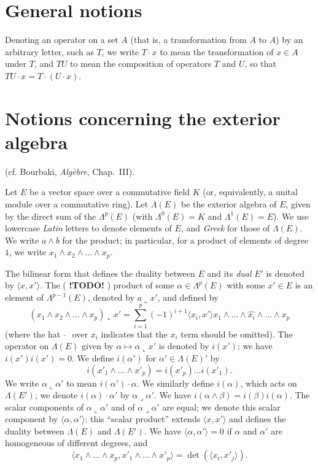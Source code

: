 \documentclass{article}
\newcommand{\llp}{\mathbin{\llcorner}}
\newcommand{\lrp}{\mathbin{\lrcorner}}
\newcommand{\todo}{\textbf{ !TODO! }}
\newcommand{\oldpage}[1]{\marginpar{\footnotesize$\Big\vert$ \textit{p.~#1}}}
\begin{document}
\section{General notions}
\label{I.1}

Denoting an operator on a set $A$ (that is, a transformation from $A$ to $A$) by an arbitrary letter, such as $T$, we write $T\cdot x$ to mean the transformation of $x\in A$ under $T$, and $TU$ to mean the composition of operators $T$ and $U$, so that $TU\cdot x = T\cdot (U\cdot x)$.


\section{Notions concerning the exterior algebra}
\label{I.2}

{(cf. {\sc Bourbaki}, \emph{Alg\`{e}bre}, Chap.~III).}

Let $E$ be a vector space over a commutative field $K$ (or, equivalently, a unital module over a commutative ring).
Let $\Lambda(E)$ be the exterior algebra of $E$, given by the direct sum of the $\Lambda^p(E)$ (with $\Lambda^0(E)=K$ and $\Lambda^1(E)=E$).
We use lowercase \emph{Latin} letters to denote elements of $E$, and \emph{Greek} for those of $\Lambda(E)$.
We write $a\wedge b$ for the product;
in particular, for a product of elements of degree~$1$, we write $x_1\wedge x_2\wedge\ldots\wedge x_p$.

The bilinear form that defines the duality between $E$ and its \emph{dual} $E'$ is denoted by $\langle x,x'\rangle$.
The (\todo) product of some $\alpha\in\Lambda^p(E)$ with some $x'\in E$ is an element of $\Lambda^{p-1}(E)$, denoted by $a\llp x'$, and defined by
\[
  (x_1\wedge x_2\wedge\ldots\wedge x_p) \llp x'
  = \sum_{i=1}^p (-1)^{i+1} \langle x_i,x' \rangle x_1\wedge\ldots\wedge\widehat{x_i}\wedge\ldots\wedge x_p
\]
(where the hat $\;\widehat{\,}\;$ over $x_i$ indicates that the $x_i$ term should be omitted).
The operator on $\Lambda(E)$ given by $\alpha\mapsto\alpha\llp x'$ is denoted by $i(x')$;
we have $i(x')i(x')=0$.
We define $i(\alpha')$ for $\alpha'\in\Lambda(E)'$ by
\[
  i(x'_1\wedge\ldots\wedge x'_p)
  = i(x'_p)\ldots i(x'_1).
\]
We write
\oldpage{8}
$\alpha\llp\alpha'$ to mean $i(\alpha')\cdot\alpha$.
We similarly define $i(\alpha)$, which acts on $\Lambda(E')$;
we denote $i(\alpha)\cdot\alpha'$ by $\alpha\lrp\alpha'$.
We have $i(\alpha\wedge\beta)=i(\beta)i(\alpha)$.
The scalar components of $\alpha\llp\alpha'$ and of $\alpha\lrp\alpha'$ are equal;
we denote this scalar component by $\langle\alpha,\alpha'\rangle$: this ``scalar product'' extends $\langle x,x'\rangle$ and defines the duality between $\Lambda(E)$ and $\Lambda(E')$.
We have $\langle\alpha,\alpha'\rangle=0$ if $\alpha$ and $\alpha'$ are homogeneous of different degrees, and
\[
  \langle x_1\wedge\ldots\wedge x_p,x'_1\wedge\ldots\wedge x'_p\rangle = \det(\langle x_i,x'_j\rangle).
\]
\end{document}
